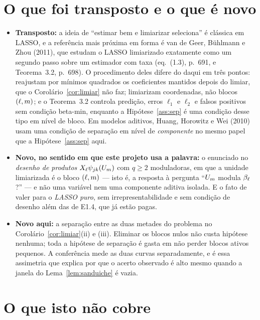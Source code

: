 \documentclass[11pt,a4paper]{article}
\begin{document}
\section{O que foi transposto e o que é novo}

\begin{itemize}[nosep, leftmargin=*]
  \item \textbf{Transposto:} a ideia de ``estimar bem e limiarizar seleciona''
    é clássica em LASSO, e a referência mais próxima em forma é van de Geer,
    Bühlmann e Zhou (2011), que estudam o LASSO limiarizado exatamente como um
    segundo passo sobre um estimador com taxa (eq.~(1.3), p.~691, e
    Teorema~3.2, p.~698). O procedimento deles difere do daqui em três
    pontos: reajustam por mínimos quadrados os coeficientes mantidos depois
    do limiar, que o Corolário~\ref{cor:limiar} não faz; limiarizam
    coordenadas, não blocos $(\ell,m)$; e o Teorema~3.2 controla predição,
    erros $\ell_1$ e $\ell_2$ e falsos positivos sem condição beta-min,
    enquanto a Hipótese~\ref{ass:sep} é uma condição desse tipo em nível de
    bloco. Em modelos aditivos, Huang,
    Horowitz e Wei (2010) usam uma condição de separação em nível de
    \emph{componente} no mesmo papel que a Hipótese~\ref{ass:sep} aqui.
  \item \textbf{Novo, no sentido em que este projeto usa a palavra:} o
    enunciado no \emph{desenho de produtos} $X_{\ell}\psi_{jk}(U_{m})$
    com $q\ge2$ moduladoras, em que a unidade limiarizada é o bloco
    $(\ell,m)$ --- isto é, a resposta à pergunta ``$U_{m}$ modula
    $\beta_{\ell}$?'' --- e não uma variável nem uma componente aditiva
    isolada. E o fato de valer para o \emph{LASSO puro}, sem
    irrepresentabilidade e sem condição de desenho além das de E1.4, que já
    estão pagas.
  \item \textbf{Novo aqui:} a separação entre as duas metades do problema no
    Corolário~\ref{cor:limiar}(ii) e (iii). Eliminar os blocos nulos não
    custa hipótese nenhuma; toda a hipótese de separação é gasta em não
    perder blocos ativos pequenos. A conferência mede as duas curvas
    separadamente, e é essa assimetria que explica por que o acerto observado
    é alto mesmo quando a janela do Lema~\ref{lem:sanduiche} é vazia.
\end{itemize}

\section{O que isto não cobre}
\end{document}
